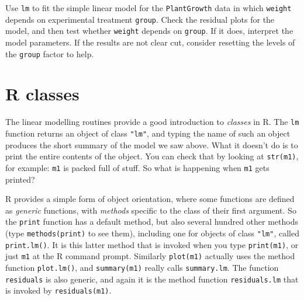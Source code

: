 \documentclass[10pt] {article}
\theoremstyle{definition}
\begin{document}
 Use {\tt lm} to fit the simple linear model for the {\tt PlantGrowth} data in which {\tt weight} depends on experimental treatment {\tt group}. Check the residual plots for the model, and then test whether {\tt weight} depends on {\tt group}. If it does, interpret the model parameters. If the results are not clear cut, consider resetting the levels of the {\tt group} factor to help. 

\section{R classes}

The linear modelling routines provide a good introduction to {\em classes} in R. The {\tt lm} function
returns an object of class \verb+"lm"+, and typing the name of such an object produces the short summary of the model we saw above. What it doesn't do is to print the entire contents of the object. You can check that by looking at \lstinline+str(m1)+, for example: {\tt m1} is packed full of stuff. So what is happening when {\tt m1} gets printed?

R provides a simple form of object orientation, where some functions are defined as {\em generic} functions, with {\em methods} specific to the class of their first argument. So the {\tt print} function has a default method, but also several hundred other methods (type \lstinline+methods(print)+ to see them), including one for objects of class \lstinline+"lm"+, called \lstinline+print.lm()+. It is this latter method that is invoked when you type \lstinline+print(m1)+, or just \lstinline+m1+ at the R command prompt. Similarly \lstinline+plot(m1)+ actually uses the method function \lstinline+plot.lm()+, and \lstinline+summary(m1)+ really calls \lstinline+summary.lm+. The function {\tt residuals} is also generic, and again it is the method function \lstinline+residuals.lm+ that is invoked by \lstinline+residuals(m1)+.  
\end{document}
